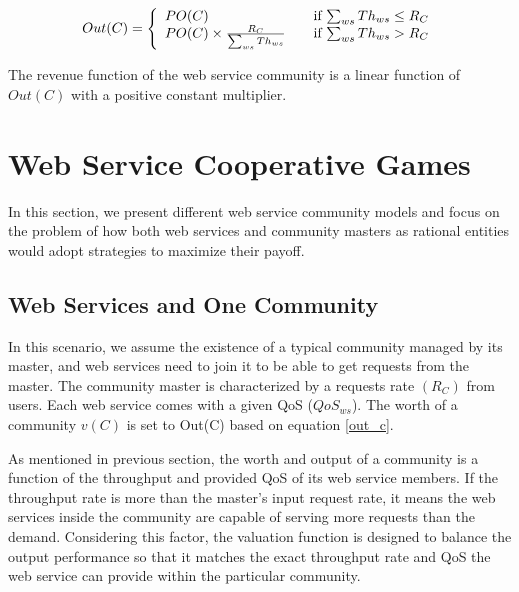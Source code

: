 \begin{equation}\label{out_c}
Out(C) = \left\{
  \begin{array}{l l}
    PO(C) & \quad \text{if $\sum_{ws}{Th_{ws}} \leq R_{C}$}\\
    PO(C) \times \frac{R_{C}}{\sum_{ws}{Th_{ws}}} & \quad \text{if $\sum_{ws}{Th_{ws}} > R_{C}$}
  \end{array} \right.
\end{equation}

The revenue function of the web service community is a linear function of $Out(C)$ with a positive constant multiplier.


 \section{Web Service Cooperative Games}\label{s:game_solution}

In this section, we present different web service community models
and focus on the problem of how both web services and community
masters as rational entities would adopt strategies to maximize
their payoff.

\subsection {Web Services and One Community}

In this scenario, we assume the existence of a typical community
managed by its master, and web services need to join it to be able
to get requests from the master. The community master is
characterized by a requests rate $(R_{C})$ from users. Each web
service comes with a given QoS ($QoS_{ws}$). The worth of a community
$v(C)$ is set to Out(C) based on equation \ref{out_c}.

As mentioned in previous section, the worth and output of a
community  is a function of the
throughput and provided QoS of its web service members. If the throughput rate is more than
the master's input request rate, it means the web services inside
the community are capable of serving more requests than the
demand. Considering this factor, the valuation function is
designed to balance the output performance so that it matches the
exact throughput rate and QoS the web service can provide within
the particular community.

